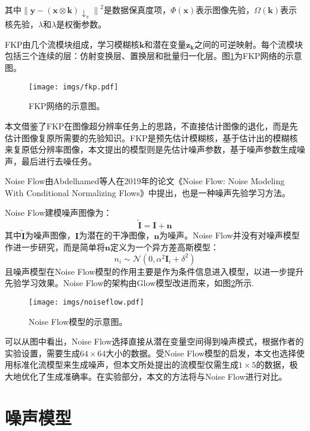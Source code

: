 其中$\left\|\mathbf{y}-(\mathbf{x} \otimes \mathbf{k}) \downarrow_s\right\|^2$是数据保真度项，$\Phi(\mathbf{x})$表示图像先验，$ \Omega(\mathbf{k})$表示核先验，$\lambda$和$\lambda$是权衡参数。

FKP由几个流模块组成，学习模糊核$\mathbf{k}$和潜在变量$\mathbf{z_k}$之间的可逆映射。每个流模块包括三个连续的层：仿射变换层、置换层和批量归一化层。图\ref{fig:fkp}为FKP网络的示意图。

\begin{figure}[h]
	\centering
	\texttt{[image: imgs/fkp.pdf]}
	\caption{FKP网络的示意图。\cite{fkp}}
	\label{fig:fkp}
\end{figure}

本文借鉴了FKP在图像超分辨率任务上的思路，不直接估计图像的退化，而是先估计图像复原所需要的先验知识。FKP是预先估计模糊核，基于估计出的模糊核来复原低分辨率图像，本文提出的模型则是先估计噪声参数，基于噪声参数生成噪声，最后进行去噪任务。

Noise Flow由Abdelhamed等人在2019年的论文《Noise Flow: Noise Modeling With Conditional Normalizing Flows》\cite{noiseflow}中提出，也是一种噪声先验学习方法。

Noise Flow建模噪声图像为：
\begin{equation}
	\tilde{\mathbf{I}}=\mathbf{I}+\mathbf{n}
\end{equation}
其中$\tilde{\mathbf{I}}$为噪声图像，$\mathbf{I}$为潜在的干净图像，$\mathbf{n}$为噪声。Noise Flow并没有对噪声模型作进一步研究，而是简单将$\mathbf{n}$定义为一个异方差高斯模型：
\begin{equation}
	n_i \sim \mathcal{N}\left(0, \alpha^2 \mathbf{I}_i+\delta^2\right)
\end{equation}
且噪声模型在Noise Flow模型的作用主要是作为条件信息进入模型，以进一步提升先验学习效果。Noise Flow的架构由Glow模型改进而来，如图\ref{fig:noiseflow}所示.

\begin{figure}[h]
	\centering
	\texttt{[image: imgs/noiseflow.pdf]}
	\caption{Noise Flow模型的示意图。\cite{noiseflow}}
	\label{fig:noiseflow}
\end{figure}

可以从图中看出，Noise Flow选择直接从潜在变量空间得到噪声模式，根据作者的实验设置，需要生成$64 \times 64$大小的数据。受Noise Flow模型的启发，本文也选择使用标准化流模型来生成噪声，但本文所处提出的流模型仅需生成$1 \times 5$的数据，极大地优化了生成准确率。在实验部分，本文的方法将与Noise Flow进行对比。

\section{噪声模型}

